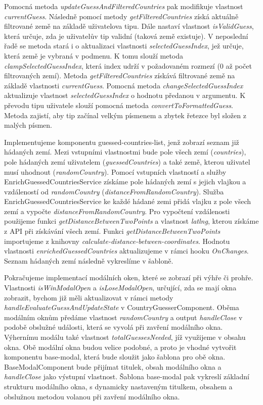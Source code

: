 Pomocná metoda \emph{updateGuessAndFilteredCountries} pak modifikuje vlastnost \emph{currentGuess}. 
Následně pomocí metody \emph{getFilteredCountries} získá aktuálně filtrované země na základě uživatelova tipu. 
Dále nastaví vlastnost \emph{isValidGuess}, která určuje, zda je uživatelův tip validní (taková země existuje). 
V neposlední řadě se metoda stará i o aktualizaci vlastnosti \emph{selectedGuessIndex}, jež určuje, která země je vybraná v podmenu. 
K tomu slouží metoda \emph{clampSelectedGuessIndex}, která index udrží v požadovaném rozmezí (0 až počet filtrovaných zemí).
Metoda \emph{getFilteredCountries} získává filtrované země na základě vlastnosti \emph{currentGuess}. 
Pomocná metoda \emph{changeSelectedGuessIndex} aktualizuje vlastnost \emph{selectedGuessIndex} o hodnotu předanou v argumentu. 
K převodu tipu uživatele slouží pomocná metoda \emph{convertToFormattedGuess}. Metoda zajistí, aby tip začínal velkým písmenem a zbytek řetezce byl složen z malých písmen.

Implementujeme komponentu guessed-countries-list, jenž zobrazí seznam již hádaných zemí. 
Mezi vstupními vlastnostmi bude pole všech zemí (\emph{countries}), pole hádaných zemí uživatelem (\emph{guessedCountries}) a také země, kterou uživatel musí uhodnout (\emph{randomCountry}).
Pomocí vstupních vlastností a služby EnrichGuessedCountriesService získáme pole hádaných zemí s jejich vlajkou a vzdáleností od \emph{randomCountry} (\emph{distanceFromRandomCountry}).
Služba EnrichGuessedCountriesService ke každé hádané zemi přidá vlajku z pole všech zemí a vypočte \emph{distanceFromRandomCountry}. 
Pro vypočtení vzdálenosti použijeme funkci \emph{getDistanceBetweenTwoPoints} a vlastnost \emph{latlng}, kterou získáme z API při získávání všech zemí. 
Funkci \emph{getDistanceBetweenTwoPoints} importujeme z knihovny \emph{calculate-distance-between-coordinates}. 
Hodnotu vlastnosti \emph{enrichedGuessedCountries} aktualizujeme v rámci hooku \emph{OnChanges}. Seznam hádaných zemí následně vykreslíme v šabloně.

Pokračujeme implementací modálních oken, které se zobrazí při výhře či prohře. 
Vlastnosti \emph{isWinModalOpen} a \emph{isLoseModalOpen}, určující, zda se mají okna zobrazit, bychom již měli aktualizovat v rámci metody \emph{handleEvaluateGuessAndUpdateState} v CountryGuesserComponent. 
Oběma modálním oknům předáme vlastnost \emph{randomCountry} a output \emph{handleClose} v podobě obslužné události, která se vyvolá při zavření modálního okna. 
Výhernímu modálu také vlastnost \emph{totalGuessesNeeded}, jíž využijeme v obsahu okna. 
Obě modální okna budou velice podobné, a proto je vhodné vytvořit komponentu base-modal, která bude sloužit jako šablona pro obě okna. 
BaseModalComponent bude přijímat titulek, obsah modálního okna a \emph{handleClose} jako výstupní vlastnost. 
Šablona base-modal pak vykreslí základní strukturu modálního okna, s dynamicky nastaveným titulkem, obsahem a obslužnou metodou volanou při zavření modálního okna.

